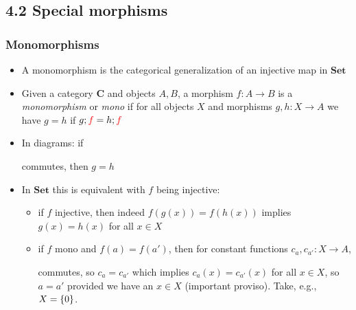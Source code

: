 \documentclass[handout]{beamer}
\newcommand{\bfsf}[1]{{\boldsymbol{#1}}}
\newcommand{\Set}{\bfsf{Set}}
\newcommand{\CC}{\bfsf{C}}
\begin{document}
\subsection{4.2 Special morphisms}
 
\frame
  {   
    \frametitle{Monomorphisms}\label{Ch4:Monos}

 \begin{itemize}[<+->]
\item A monomorphism is the categorical generalization of an injective map in $\Set$
\item Given a category $\CC$ and objects $A,B$, a morphism $f: A\to B$ is a
\emph{monomorphism} or \emph{mono} if for all objects $X$ and 
morphisms $g,h: X\to A$ we have $g=h$ if $g;{\color{red}f} = h;{\color{red}f}$
\item In diagrams: if
 commutes, then $g=h$
\item In $\Set$ this is equivalent with $f$ being injective:
 \begin{itemize}
    \item if $f$ injective, then indeed $f(g(x))=f(h(x))$ implies $g(x)=h(x)$ for all $x\in X$
    \item if $f$ mono and $f(a)=f(a')$, then 
for constant functions $c_a,c_{a'} : X\to A$,
commutes, so $c_{a}=c_{a'}$ which implies $c_{a}(x)=c_{a'}(x)$ for all $x\in X$, so $a=a'$
{\color{red}provided we have an $x\in X $ (important proviso)}. Take, e.g., $X=\{0\}$.
\end{itemize}
 \end{itemize}

 }
\end{document}
